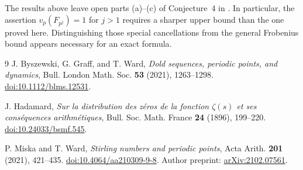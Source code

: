 \documentclass[11pt]{article}
\theoremstyle{remark}
\begin{document}
The results above leave open parts (a)--(c) of Conjecture~4 in \cite{MW}. In particular, the assertion
$v_p(F_{p^j})=1$ for $j>1$ requires a sharper upper bound than the one
proved here. Distinguishing those special cancellations from the general
Frobenius bound appears necessary for an exact formula.

\begin{thebibliography}{9}
J. Byszewski, G. Graff, and T. Ward,
\emph{Dold sequences, periodic points, and dynamics},
Bull. London Math. Soc. \textbf{53} (2021), 1263--1298.
\href{https://doi.org/10.1112/blms.12531}{doi:10.1112/blms.12531}.

J. Hadamard,
\emph{Sur la distribution des z\'eros de la fonction $\zeta(s)$ et ses
cons\'equences arithm\'etiques},
Bull. Soc. Math. France \textbf{24} (1896), 199--220.
\href{https://doi.org/10.24033/bsmf.545}{doi:10.24033/bsmf.545}.

P. Miska and T. Ward,
\emph{Stirling numbers and periodic points},
Acta Arith. \textbf{201} (2021), 421--435.
\href{https://doi.org/10.4064/aa210309-9-8}{doi:10.4064/aa210309-9-8}.
Author preprint: \href{https://arxiv.org/abs/2102.07561}{arXiv:2102.07561}.
\end{thebibliography}
\end{document}
